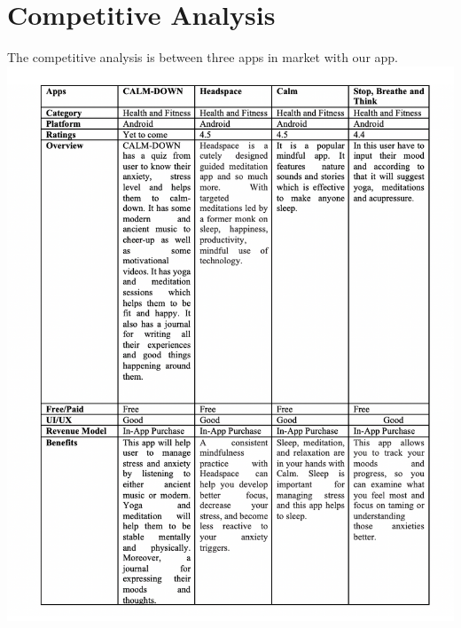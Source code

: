 \section{Competitive Analysis}
The competitive analysis is between three apps in market with our app.
\newline
\includegraphics[scale=0.9]{CA.png}
